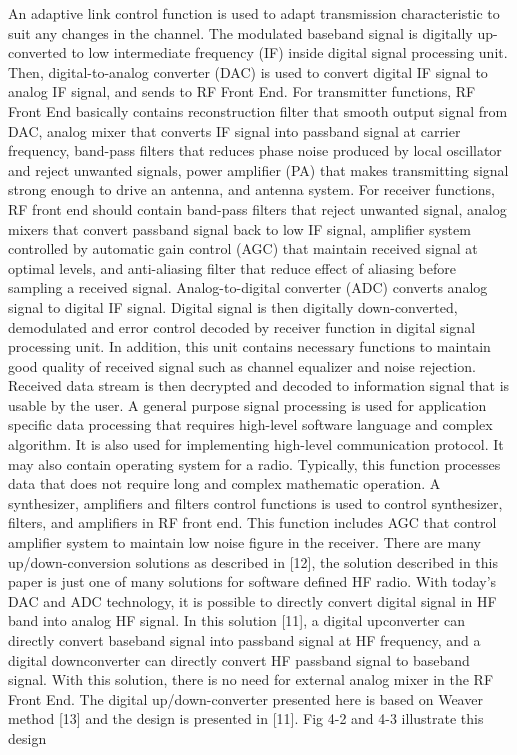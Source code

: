 \documentclass[conference]{IEEEtran}
\begin{document}
An adaptive link control function is used to adapt transmission characteristic to suit any changes in the channel. The modulated baseband signal is digitally up-converted to low intermediate frequency (IF) inside digital signal processing unit. Then, digital-to-analog converter (DAC) is used to convert digital IF signal to analog IF signal, and sends to RF Front End. For transmitter functions, RF Front End basically contains reconstruction filter that smooth output signal from DAC, analog mixer that converts IF signal into passband signal at carrier frequency, band-pass filters that reduces phase noise produced by local oscillator and reject unwanted signals, power amplifier (PA) that makes transmitting signal strong enough to drive an antenna, and antenna system. 
For receiver functions, RF front end should contain band-pass filters that reject unwanted signal, analog mixers that convert passband signal back to low IF signal, amplifier system controlled by automatic gain control (AGC) that maintain received signal at optimal levels, and anti-aliasing filter that reduce effect of aliasing before sampling a received signal. Analog-to-digital converter (ADC) converts analog signal to digital IF signal. Digital signal is then digitally down-converted, demodulated and error control decoded by receiver function in digital signal processing unit. In addition, this unit contains necessary functions to maintain good quality of received signal such as channel equalizer and noise rejection. Received data stream is then decrypted and decoded to information signal that is usable by the user. 
A general purpose signal processing is used for application specific data processing that requires high-level software language and complex algorithm. It is also used for implementing high-level communication protocol. It may also contain operating system for a radio. Typically, this function processes data that does not require long and complex mathematic operation. 
A synthesizer, amplifiers and filters control functions is used to control synthesizer, filters, and amplifiers in RF front end. This function includes AGC that control amplifier system to maintain low noise figure in the receiver. 
There are many up/down-conversion solutions as described in [12], the solution described in this paper is just one of many solutions for software defined HF radio. With today’s DAC and ADC technology, it is possible to directly convert digital signal in HF band into analog HF signal. In this solution [11], a digital upconverter can directly convert baseband signal into passband signal at HF frequency, and a digital downconverter can directly convert HF passband signal to baseband signal. With this solution, there is no need for external analog mixer in the RF Front End. The digital up/down-converter presented here is based on Weaver method [13] and the design is presented in [11]. Fig 4-2 and 4-3 illustrate this design
\end{document}
